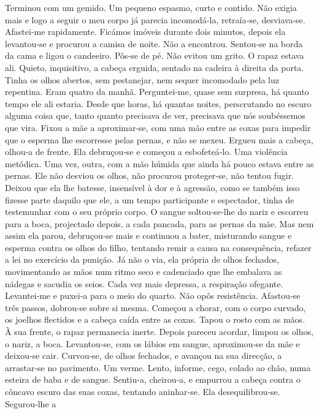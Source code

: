 Terminou com um gemido. Um pequeno espasmo, curto e contido. Não exigia
mais e logo a seguir o meu corpo já parecia incomodá­‑la, retraía­‑se,
desviava­‑se. Afastei­‑me rapidamente. Ficámos imóveis durante dois
minutos, depois ela levantou­‑se e procurou a camisa de noite. Não a
encontrou. Sentou­‑se na borda da cama e ligou o candeeiro. Pôs­‑se de
pé. Não evitou um grito. O rapaz estava ali. Quieto, inquisitivo, a
cabeça erguida, sentado na cadeira à direita da porta. Tinha os olhos
abertos, sem pestanejar, nem sequer incomodado pela luz repentina. Eram
quatro da manhã. Perguntei­‑me, quase sem surpresa, há quanto tempo ele
ali estaria. Desde que horas, há quantas noites, perscrutando no escuro
alguma coisa que, tanto quanto precisava de ver, precisava que nós
soubéssemos que vira. Fixou a mãe a aproximar­‑se, com uma mão entre as
coxas para impedir que o esperma lhe escorresse pelas pernas, e não se
mexeu. Ergueu mais a cabeça, olhou­‑a de frente. Ela debruçou­‑se e
começou a esbofeteá­‑lo. Uma violência metódica. Uma vez, outra, com a
mão húmida que ainda há pouco estava entre as pernas. Ele não desviou os
olhos, não procurou proteger­‑se, não tentou fugir. Deixou que ela lhe
batesse, insensível à dor e à agressão, como se também isso fizesse
parte daquilo que ele, a um tempo participante e espectador, tinha de
testemunhar com o seu próprio corpo. O sangue soltou­‑se­‑lhe do nariz e
escorreu para a boca, projectado depois, a cada pancada, para as pernas
da mãe. Mas nem assim ela parou, debruçou­‑se mais e continuou a bater,
misturando sangue e esperma contra os olhos do filho, tentando remir a
causa na consequência, refazer a lei no exercício da punição. Já não o
via, ela própria de olhos fechados, movimentando as mãos num ritmo seco
e cadenciado que lhe embalava as nádegas e sacudia os seios. Cada vez
mais depressa, a respiração ofegante. Levantei­‑me e puxei­‑a para o
meio do quarto. Não opôs resistência. Afastou­‑se três passos,
dobrou­‑se sobre si mesma. Começou a chorar, com o corpo curvado, os
joelhos flectidos e a cabeça caída entre as coxas. Tapou o rosto com as
mãos. À sua frente, o rapaz permanecia inerte. Depois pareceu acordar,
limpou os olhos, o nariz, a boca. Levantou­‑se, com os lábios em sangue,
aproximou­‑se da mãe e deixou­‑se cair. Curvou­‑se, de olhos fechados, e
avançou na sua direcção, a arrastar­‑se no pavimento. Um verme. Lento,
informe, cego, colado ao chão, numa esteira de baba e de sangue.
Sentiu­‑a, cheirou­‑a, e empurrou a cabeça contra o côncavo escuro das
suas coxas, tentando aninhar­‑se. Ela desequilibrou­‑se. Segurou­‑lhe a
